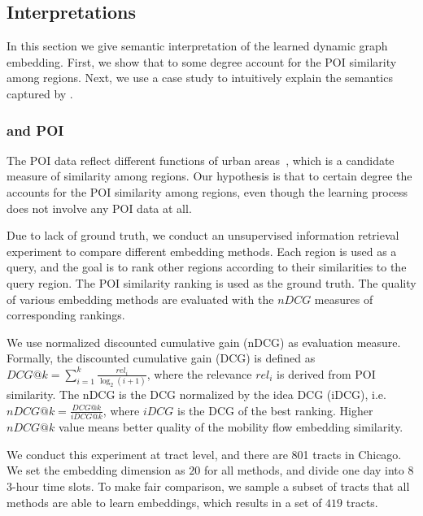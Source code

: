 \subsection{Interpretations}

In this section we give semantic interpretation of the learned dynamic graph embedding. First, we show that \hdge to some degree account for the POI similarity among regions. Next, we use a case study to intuitively explain the semantics captured by \hdge.



\subsubsection{\hdge and POI}

The POI data reflect different functions of urban areas~\cite{yuan2012discovering}, which is a candidate measure of similarity among regions. Our hypothesis is that to certain degree the \hdge accounts for the POI similarity among regions, even though the \hdge learning process does not involve any POI data at all. 

Due to lack of ground truth, we conduct an unsupervised information retrieval experiment to compare different embedding methods. Each region is used as a query, and the goal is to rank other regions according to their similarities to the query region. The POI similarity ranking is used as the ground truth. The quality of various embedding methods are evaluated with the $nDCG$ measures of corresponding rankings.

We use normalized discounted cumulative gain (nDCG) as evaluation measure. Formally, the discounted cumulative gain (DCG) is defined as $DCG@k = \sum_{i=1}^k\frac{rel_i}{\log_2 (i+1)}$, where the relevance $rel_i$ is derived from POI similarity. The nDCG is the DCG normalized by the idea DCG (iDCG), i.e. $nDCG@k = \frac{DCG@k}{iDCG@k}$, 
where $iDCG$ is the DCG of the best ranking. Higher $nDCG@k$ value means better quality of the mobility flow embedding similarity.


We conduct this experiment at tract level, and there are 801 tracts in Chicago. We set the embedding dimension as $20$ for all methods, and divide one day into $8$ 3-hour time slots. To make fair comparison, we sample a subset of tracts that all methods are able to learn embeddings, which results in a set of $419$ tracts.

